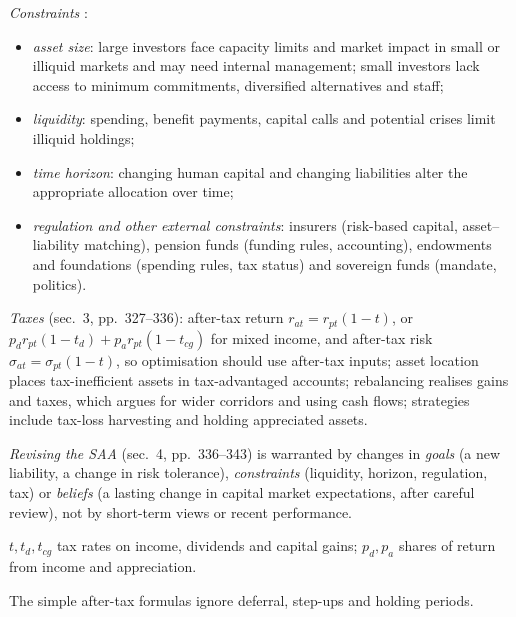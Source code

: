 \begin{qfmethod}\label{meth:allocation-constraints-taxes-revision}
 \emph{Constraints} \citep[chap.~7, sec.~2, pp.~308--327]{portfolio-management-in-practice-v1-2020}:
\begin{itemize}
\item \emph{asset size}: large investors face capacity limits and market impact in small or illiquid markets and may need internal management; small investors lack access to minimum commitments, diversified alternatives and staff;
\item \emph{liquidity}: spending, benefit payments, capital calls and potential crises limit illiquid holdings;
\item \emph{time horizon}: changing human capital and changing liabilities alter the appropriate allocation over time;
\item \emph{regulation and other external constraints}: insurers (risk-based capital, asset--liability matching), pension funds (funding rules, accounting), endowments and foundations (spending rules, tax status) and sovereign funds (mandate, politics).
\end{itemize}
\emph{Taxes} (sec.~3, pp.~327--336): after-tax return $r_{at}=r_{pt}(1-t)$, or $p_dr_{pt}(1-t_d)+p_ar_{pt}(1-t_{cg})$ for mixed income, and after-tax risk $\sigma_{at}=\sigma_{pt}(1-t)$, so optimisation should use after-tax inputs; asset location places tax-inefficient assets in tax-advantaged accounts; rebalancing realises gains and taxes, which argues for wider corridors and using cash flows; strategies include tax-loss harvesting and holding appreciated assets.

\emph{Revising the SAA} (sec.~4, pp.~336--343) is warranted by changes in \emph{goals} (a new liability, a change in risk tolerance), \emph{constraints} (liquidity, horizon, regulation, tax) or \emph{beliefs} (a lasting change in capital market expectations, after careful review), not by short-term views or recent performance.

 $t,t_d,t_{cg}$ tax rates on income, dividends and capital gains; $p_d,p_a$ shares of return from income and appreciation.

 The simple after-tax formulas ignore deferral, step-ups and holding periods.


\end{qfmethod}
